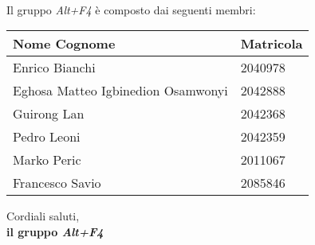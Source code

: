 \documentclass[a4paper, 12pt]{article}
\begin{document}
\vspace{0.75cm} 
\\
\noindent
Il gruppo \textit{Alt+F4} è composto dai seguenti membri:
\begin{table}[H]
    \centering
    \begin{tabular}{| l | l |}
    \hline
    \textbf{Nome Cognome} & 
    \textbf{Matricola}\\ 
        \hline
            Enrico Bianchi&
            2040978 \\
        \hline 
            Eghosa Matteo Igbinedion Osamwonyi&
            2042888 \\
        \hline 
            Guirong Lan&
            2042368 \\
        \hline 
            Pedro Leoni&
            2042359 \\
        \hline 
            Marko Peric&
            2011067 \\
        \hline 
            Francesco Savio&
            2085846 \\
        \hline 
    \end{tabular}
\end{table}
\noindent
Cordiali saluti,\\
\textbf{il gruppo \textit{Alt+F4}}
\end{document}
